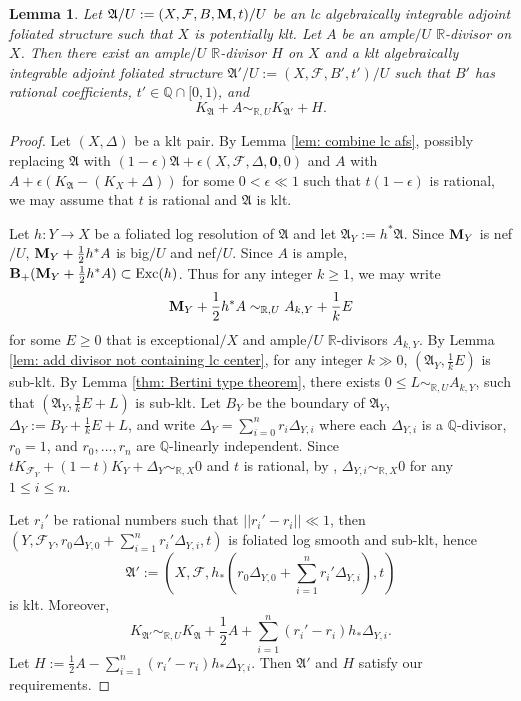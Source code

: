 \documentclass[12pt]{amsart}
\numberwithin{equation}{section}
\newcommand{\BB}{{\bf{B}}}
\newcommand{\Mm}{{\bf{M}}}
\newcommand{\Rr}{\mathbb{R}}
\newcommand{\Exc}{\operatorname{Exc}}
\newcommand{\Aa}{{\mathfrak{A}}}
\newcommand{\Ff}{\mathcal{F}}
\newtheorem{lem}[thm]{Lemma}
\theoremstyle{definition}
\theoremstyle{definition}
\theoremstyle{definition}
\begin{document}
\begin{lem}\label{lem: perturbation to q coefficient no m}
Let $\Aa/U:=(X,\Ff,B,\Mm,t)/U$ be an lc algebraically integrable adjoint foliated structure such that $X$ is potentially klt. Let $A$ be an ample$/U$ $\Rr$-divisor on $X$. Then there exist an ample$/U$ $\Rr$-divisor $H$ on $X$ and a klt algebraically integrable adjoint foliated structure $\Aa'/U:=(X,\Ff,B',t')/U$ such that $B'$ has rational coefficients, $t'\in\mathbb Q\cap [0,1)$, and
$$K_{\Aa}+A\sim_{\mathbb R,U}K_{\Aa'}+H.$$
\end{lem}
\begin{proof}
Let $(X,\Delta)$ be a klt pair. By Lemma \ref{lem: combine lc afs}, possibly replacing $\Aa$ with $(1-\epsilon)\Aa+\epsilon(X,\Ff,\Delta,\bm{0},0)$
and $A$ with $A+\epsilon(K_{\Aa}-(K_X+\Delta))$ for some $0<\epsilon\ll 1$ such that $t(1-\epsilon)$ is rational, we may assume that $t$ is rational and $\Aa$ is klt.

Let $h: Y\rightarrow X$ be a foliated log resolution of $\Aa$ and let $\Aa_Y:=h^*\Aa$. Since $\Mm_Y$ is nef$/U$, $\Mm_Y+\frac{1}{2}h^*A$ is big$/U$ and nef$/U$. Since $A$ is ample, $\BB_+(\Mm_Y+\frac{1}{2}h^*A)\subset\Exc(h)$. Thus for any integer $k\geq 1$, 
we may write
$$\Mm_Y+\frac{1}{2}h^*A\sim_{\mathbb R,U}A_{k,Y}+\frac{1}{k}E$$
for some $E\geq 0$ that is exceptional$/X$ and ample$/U$ $\mathbb R$-divisors $A_{k,Y}$. By Lemma \ref{lem: add divisor not containing lc center}, for any integer $k\gg 0$, $(\Aa_Y,\frac{1}{k}E)$ is sub-klt. By Lemma \ref{thm: Bertini type theorem}, there exists $0\leq L\sim_{\mathbb R,U}A_{k,Y}$, such that $(\Aa_Y,\frac{1}{k}E+L)$ is sub-klt. Let $B_Y$ be the boundary of $\Aa_Y$, $\Delta_Y:=B_Y+\frac{1}{k}E+L$, and write $\Delta_Y=\sum_{i=0}^n r_i\Delta_{Y,i}$ where each $\Delta_{Y,i}$ is a $\mathbb Q$-divisor, $r_0=1$, and $r_0,\dots,r_n$ are $\mathbb Q$-linearly independent. Since $tK_{\Ff_Y}+(1-t)K_Y+\Delta_Y\sim_{\mathbb R,X}0$ and $t$ is rational, by \cite[Lemma 5.3]{HLS24}, $\Delta_{Y,i}\sim_{\mathbb R,X}0$ for any $1\leq i\leq n$.

Let $r_i'$ be rational numbers such that $||r_i'-r_i||\ll 1$, then $(Y,\Ff_Y,r_0\Delta_{Y,0}+\sum_{i=1}^n r_i'\Delta_{Y,i},t)$ is foliated log smooth and sub-klt, hence $$\Aa':=\left(X,\Ff,h_*\left(r_0\Delta_{Y,0}+\sum_{i=1}^n r_i'\Delta_{Y,i}\right),t\right)$$
is klt. Moreover, 
$$K_{\Aa'}\sim_{\mathbb R,U}K_{\Aa}+\frac{1}{2}A+\sum_{i=1}^n(r_i'-r_i)h_*\Delta_{Y,i}.$$
Let $H:=\frac{1}{2}A-\sum_{i=1}^n(r_i'-r_i)h_*\Delta_{Y,i}$. Then $\Aa'$ and $H$ satisfy our requirements.
\end{proof}
\end{document}
